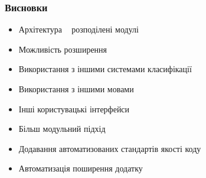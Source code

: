 \documentclass{beamer}
\begin{document}
\begin{frame}
	\frametitle{Висновки}
	\begin{itemize}
		\item Архітектура \textemdash~ розподілені модулі
	  \item Можливість розширення
		\item Використання з іншими системами класифікації
		\item Використання з іншими мовами
		\item Інші користувацькі інтерфейси
	  \item Більш модульний підхід
    \item Додавання автоматизованих стандартів якості коду
	  \item Автоматизація поширення додатку
	\end{itemize}
\end{frame}
\end{document}
